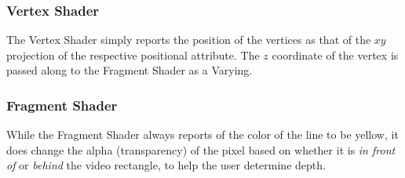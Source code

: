 \subsubsection{Vertex Shader}
The Vertex Shader simply reports the position of the vertices as that of the $xy$ projection of the respective positional attribute. The $z$ coordinate of the vertex is passed along to the Fragment Shader as a Varying.

\subsubsection{Fragment Shader}
While the Fragment Shader always reports of the color of the line to be yellow, it does change the alpha (transparency) of the pixel based on whether it is \emph{in front of} or \emph{behind} the video rectangle, to help the user determine depth.
